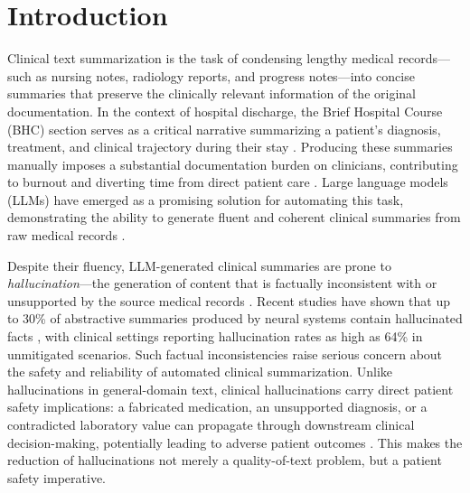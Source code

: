 \documentclass[12pt,a4paper,oneside]{report}
\begin{document}
\tableofcontents
\listoffigures
\listoftables

\newpage
{}

\chapter{Introduction}
\label{ch:introduction}


Clinical text summarization is the task of condensing lengthy medical records---such as nursing notes, radiology reports, and progress notes---into concise summaries that preserve the clinically relevant information of the original documentation. In the context of hospital discharge, the Brief Hospital Course (BHC) section serves as a critical narrative summarizing a patient's diagnosis, treatment, and clinical trajectory during their stay \cite{vanveen2024clinical}. Producing these summaries manually imposes a substantial documentation burden on clinicians, contributing to burnout and diverting time from direct patient care \cite{johnson2016mimiciii}. Large language models (LLMs) have emerged as a promising solution for automating this task, demonstrating the ability to generate fluent and coherent clinical summaries from raw medical records \cite{vanveen2024clinical, agrawal2022llmclinical}.

Despite their fluency, LLM-generated clinical summaries are prone to \textit{hallucination}---the generation of content that is factually inconsistent with or unsupported by the source medical records \cite{ji2023hallucination, maynez2020faithfulness}. Recent studies have shown that up to 30\% of abstractive summaries produced by neural systems contain hallucinated facts \cite{ji2023hallucination}, with clinical settings reporting hallucination rates as high as 64\% in unmitigated scenarios. Such factual inconsistencies raise serious concern about the safety and reliability of automated clinical summarization. Unlike hallucinations in general-domain text, clinical hallucinations carry direct patient safety implications: a fabricated medication, an unsupported diagnosis, or a contradicted laboratory value can propagate through downstream clinical decision-making, potentially leading to adverse patient outcomes \cite{vanveen2024clinical}. This makes the reduction of hallucinations not merely a quality-of-text problem, but a patient safety imperative.
\end{document}
